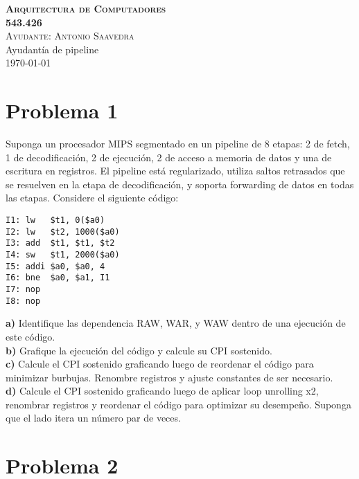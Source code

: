 \documentclass[letterpaper,11pt,notitlepage]{article}
\begin{document}

\begin{center}
\textsc{ \huge \bfseries Arquitectura de Computadores\\[0.2cm] 543.426}\\[0.2cm]
\textsc{ Ayudante: Antonio Saavedra}\\[0.2cm]
Ayudantía de pipeline\\

\today

\end{center}



\section{Problema 1}

Suponga un procesador MIPS segmentado en un pipeline de 8 etapas: 2 de fetch, 1 de decodificación, 2 de ejecución, 2 de acceso a memoria de datos y una de escritura en registros. El pipeline está regularizado, utiliza saltos retrasados que se resuelven en la etapa de decodificación, y soporta forwarding de datos en todas las etapas. Considere el siguiente código:
\begin{lstlisting}[style=C]
I1: lw   $t1, 0($a0)
I2: lw   $t2, 1000($a0)
I3: add  $t1, $t1, $t2
I4: sw   $t1, 2000($a0)
I5: addi $a0, $a0, 4
I6: bne  $a0, $a1, I1
I7: nop
I8: nop
\end{lstlisting}
\textbf{a)} Identifique las dependencia RAW, WAR, y WAW dentro de una ejecución de este código.
\\

\textbf{b)} Grafique la ejecución del código y calcule su CPI sostenido.
\\

\textbf{c)} Calcule el CPI sostenido graficando luego de reordenar el código para minimizar burbujas. Renombre registros y ajuste constantes de ser necesario.
\\

\textbf{d)} Calcule el CPI sostenido graficando luego de aplicar loop unrolling x2, renombrar registros y reordenar el código para optimizar su desempeño. Suponga que el lado itera un número par de veces.
\newpage
\section{Problema 2}
\end{document}
